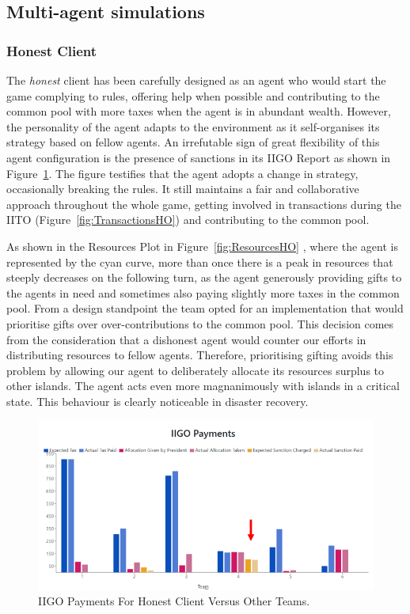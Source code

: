 \subsection{Multi-agent simulations} \label{againstothers}
\subsubsection{Honest Client} \label{honestAO}
The \emph{honest} client has been carefully designed as an agent who would start the game complying to rules, offering help when possible and contributing to the common pool with more taxes when the agent is in abundant wealth. However, the personality of the agent adapts to the environment as it self-organises its strategy based on fellow agents. An irrefutable sign of great flexibility of this agent configuration is the presence of sanctions in its IIGO Report as shown in Figure~\ref{fig:IIGOHO}. The figure testifies that the agent adopts a change in strategy, occasionally breaking the rules. It still maintains a fair and collaborative approach throughout the whole game, getting involved in transactions during the IITO (Figure~\ref{fig:TransactionsHO}) and contributing to the common pool. 

As shown in the Resources Plot in Figure~\ref{fig:ResourcesHO} , where the agent is represented by the cyan curve, more than once there is a peak in resources that steeply decreases on the following turn, as the agent generously providing gifts to the agents in need and sometimes also paying slightly more taxes in the common pool. From a design standpoint the team opted for an implementation that would prioritise gifts over over-contributions to the common pool. This decision comes from the consideration that a dishonest agent would counter our efforts in distributing resources to fellow agents. Therefore, prioritising gifting avoids this problem by allowing our agent to deliberately allocate its resources surplus to other islands. The agent acts even more magnanimously with islands in a critical state. This behaviour is clearly noticeable in disaster recovery.
\begin{figure}[H]
\centering
\includegraphics[scale=0.6]{12_team4_agentdesign/images/IIGOHO.PNG}
\caption{IIGO Payments For Honest Client Versus Other Teams.}
\label{fig:IIGOHO}
\end{figure}

